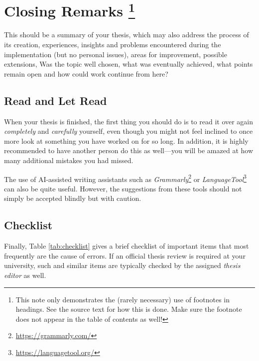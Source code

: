 \chapter[Results]{Closing Remarks%
%
\protect\footnote{This note only demonstrates the (rarely necessary)
use of footnotes in headings. See the source text for how this is done.
Make sure the footnote does not appear in the table of contents as well!}}%
\label{cha:Closing}

This should be a summary of your thesis, which may also address the
process of its creation, experiences, insights and problems encountered during
the implementation (but no personal issues), areas for improvement, possible
extensions, \etc
Was the topic well chosen, what was eventually achieved,
what points remain open and how could work continue from here?


\section{Read and Let Read}

When your thesis is finished, the first thing you should do is to read it
over again \emph{completely} and \emph{carefully} yourself, even though you
might not feel inclined to once more look at something you have worked on for
so long. In addition, it is highly recommended to have another person do this
as well---you will be amazed at how many additional mistakes you had missed.

The use of AI-assisted writing assistants such as
\emph{Grammarly}\footnote{\url{https://grammarly.com/}} or
\emph{LanguageTool}\footnote{\url{https://languagetool.org/}}
can also be quite useful. However, the suggestions from these tools should not
simply be accepted blindly but with caution.


\section{Checklist}

Finally, Table \ref{tab:checklist} gives a brief checklist of important items
that most frequently are the cause of errors. If an official thesis review is 
required at your university, such and similar items are typically checked 
by the assigned \emph{thesis editor} as well.

